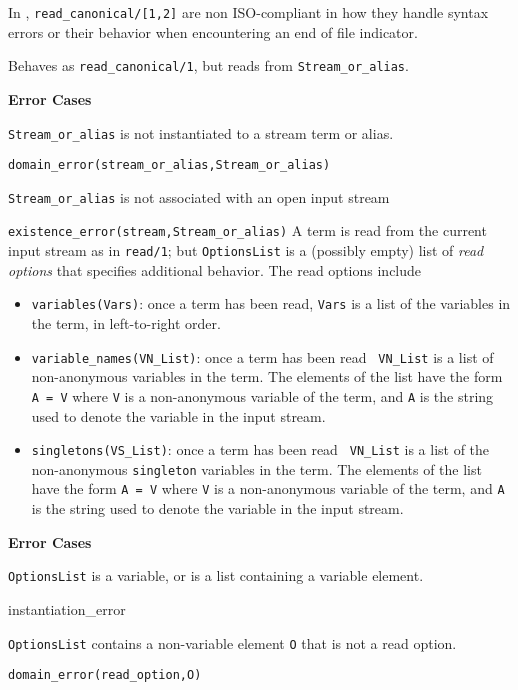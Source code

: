 \begin{description}
In \version, {\tt read\_canonical/[1,2]} are non ISO-compliant in how they
handle syntax errors or their behavior when encountering an end of
file indicator.

Behaves as {\tt read\_canonical/1}, but reads from {\tt Stream\_or\_alias}.

{\bf Error Cases}
\bi
\item 	{\tt Stream\_or\_alias} is not instantiated to a stream term or alias.
\bi
\item 	{\tt domain\_error(stream\_or\_alias,Stream\_or\_alias)}
\ei
\item 	{\tt Stream\_or\_alias} is not associated with an open input stream
\bi
\item 	{\tt existence\_error(stream,Stream\_or\_alias)}
\ei
\ei
%
A term is read from the current input stream as in {\tt read/1}; but
{\tt OptionsList} is a (possibly empty) list of {\em read options}
that specifies additional behavior.  The read options include
\begin{itemize}
\item {\tt variables(Vars)}: once a term has been read, {\tt Vars} is a
list of the variables in the term, in left-to-right order. 
\item {\tt variable\_names(VN\_List)}: once a term has been read {\tt
VN\_List} is a list of non-anonymous variables in the term.  The
elements of the list have the form {\tt A = V} where {\tt V} is a
non-anonymous variable of the term, and {\tt A} is the string used to
denote the variable in the input stream.
\item {\tt singletons(VS\_List)}: once a term has been read {\tt
VN\_List} is a list of the non-anonymous {\tt singleton} variables in
the term.  The elements of the list have the form {\tt A = V} where
{\tt V} is a non-anonymous variable of the term, and {\tt A} is the
string used to denote the variable in the input stream.
\end{itemize}

{\bf Error Cases}
\bi
\item 	{\tt OptionsList} is a variable, or is a list containing a
	variable element. 
\bi 
\item instantiation\_error
\ei
\item     {\tt OptionsList} contains a non-variable element {\tt O} that is not
	a read option.
\bi
\item 	{\tt domain\_error(read\_option,O)}
\ei
\ei


\end{description}
